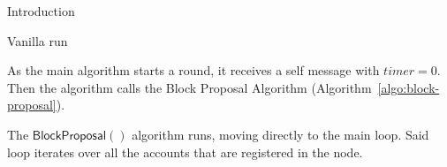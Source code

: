 \documentclass[10pt,a4paper]{article}
\begin{document}
\begin{section}{Introduction}
\begin{subsection}{Vanilla run}



As the main algorithm starts a round, it receives a self message with $timer=0$.
Then the algorithm calls the Block Proposal Algorithm (Algorithm~\ref{algo:block-proposal}).



The $\mathsf{BlockProposal}()$ algorithm runs, moving directly to the main loop. Said loop
iterates over all the accounts that are registered in the node.


\end{subsection}
\end{section}
\end{document}
